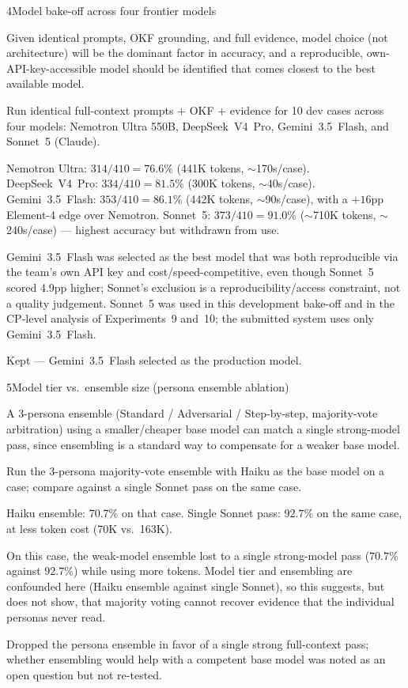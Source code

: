 \begin{explog}{4}{Model bake-off across four frontier models}
\item[Hypothesis] Given identical prompts, OKF grounding, and full evidence, model choice (not architecture) will be the dominant factor in accuracy, and a reproducible, own-API-key-accessible model should be identified that comes closest to the best available model.
\item[Method] Run identical full-context prompts + OKF + evidence for 10 dev cases across four models: Nemotron Ultra 550B, DeepSeek~V4~Pro, Gemini~3.5~Flash, and Sonnet~5 (Claude).
\item[Result] Nemotron Ultra: $314/410 = 76.6\%$ (441K tokens, $\sim$170s/case). DeepSeek~V4~Pro: $334/410 = 81.5\%$ (300K tokens, $\sim$40s/case). Gemini~3.5~Flash: $353/410 = 86.1\%$ (442K tokens, $\sim$90s/case), with a $+16$pp Element-4 edge over Nemotron. Sonnet~5: $373/410 = 91.0\%$ ($\sim$710K tokens, $\sim$240s/case) --- highest accuracy but withdrawn from use.
\item[Inference] Gemini~3.5~Flash was selected as the best model that was both reproducible via the team's own API key and cost/speed-competitive, even though Sonnet~5 scored 4.9pp higher; Sonnet's exclusion is a reproducibility/access constraint, not a quality judgement. Sonnet~5 was used in this development bake-off and in the CP-level analysis of Experiments~9 and~10; the submitted system uses only Gemini~3.5~Flash.
\item[Verdict] Kept --- Gemini~3.5~Flash selected as the production model.
\end{explog}


\begin{explog}{5}{Model tier vs.\ ensemble size (persona ensemble ablation)}
\item[Hypothesis] A 3-persona ensemble (Standard / Adversarial / Step-by-step, majority-vote arbitration) using a smaller/cheaper base model can match a single strong-model pass, since ensembling is a standard way to compensate for a weaker base model.
\item[Method] Run the 3-persona majority-vote ensemble with Haiku as the base model on a case; compare against a single Sonnet pass on the same case.
\item[Result] Haiku ensemble: $70.7\%$ on that case. Single Sonnet pass: $92.7\%$ on the same case, at less token cost (70K vs.\ 163K).
\item[Inference] On this case, the weak-model ensemble lost to a single strong-model pass ($70.7\%$ against $92.7\%$) while using more tokens. Model tier and ensembling are confounded here (Haiku ensemble against single Sonnet), so this suggests, but does not show, that majority voting cannot recover evidence that the individual personas never read.
\item[Verdict] Dropped the persona ensemble in favor of a single strong full-context pass; whether ensembling would help with a competent base model was noted as an open question but not re-tested.
\end{explog}


